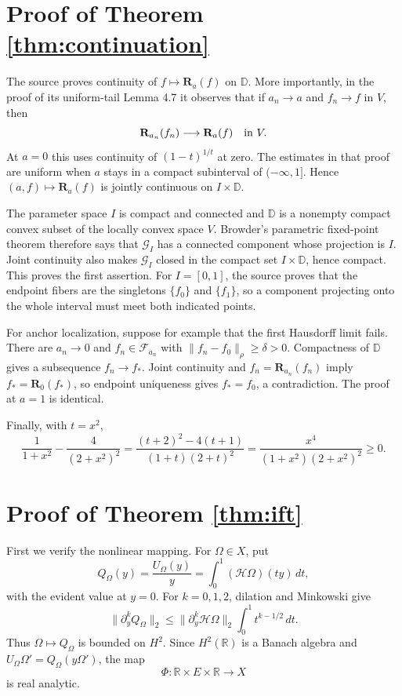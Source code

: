 \documentclass[11pt]{article}
\newcommand{\R}{\mathbb R}
\newcommand{\D}{\mathbb D}
\newcommand{\cH}{\mathcal H}
\newcommand{\cR}{\mathbf R}
\begin{document}
\section{Proof of Theorem \ref{thm:continuation}}

The source proves continuity of $f\mapsto\cR_a(f)$ on $\D$.  More
importantly, in the proof of its uniform-tail Lemma 4.7 it observes that if
$a_n\to a$ and $f_n\to f$ in $V$, then
\[
 \cR_{a_n}(f_n)\longrightarrow\cR_a(f)\quad\hbox{in }V.
\]
At $a=0$ this uses continuity of $(1-t)^{1/t}$ at zero.  The estimates in
that proof are uniform when $a$ stays in a compact subinterval of
$(-\infty,1]$.  Hence $(a,f)\mapsto\cR_a(f)$ is jointly continuous on
$I\times\D$.

The parameter space $I$ is compact and connected and $\D$ is a nonempty
compact convex subset of the locally convex space $V$.  Browder's parametric
fixed-point theorem therefore says that $\mathcal G_I$ has a connected
component whose projection is $I$.  Joint continuity also makes
$\mathcal G_I$ closed in the compact set $I\times\D$, hence compact.  This
proves the first assertion.  For $I=[0,1]$, the source proves that the endpoint
fibers are the singletons $\{f_0\}$ and $\{f_1\}$, so a component projecting
onto the whole interval must meet both indicated points.

For anchor localization, suppose for example that the first Hausdorff limit
fails.  There are $a_n\to0$ and $f_n\in\mathcal F_{a_n}$ with
$\|f_n-f_0\|_\rho\geq\delta>0$.  Compactness of $\D$ gives a subsequence
$f_n\to f_*$.  Joint continuity and $f_n=\cR_{a_n}(f_n)$ imply
$f_*=\cR_0(f_*)$, so endpoint uniqueness gives $f_*=f_0$, a contradiction.
The proof at $a=1$ is identical.

Finally, with $t=x^2$,
\[
 \frac1{1+x^2}-\frac4{(2+x^2)^2}
 =\frac{(t+2)^2-4(t+1)}{(1+t)(2+t)^2}
 =\frac{x^4}{(1+x^2)(2+x^2)^2}\geq0.
\]

\section{Proof of Theorem \ref{thm:ift}}

First we verify the nonlinear mapping.  For $\Omega\in X$, put
\[
 Q_\Omega(y)=\frac{U_\Omega(y)}y
 =\int_0^1(\cH\Omega)(ty)\,dt,
\]
with the evident value at $y=0$.  For $k=0,1,2$, dilation and Minkowski give
\[
 \|\partial_y^k Q_\Omega\|_2
 \leq \|\partial_y^k\cH\Omega\|_2
       \int_0^1t^{k-1/2}\,dt.
\]
Thus $\Omega\mapsto Q_\Omega$ is bounded on $H^2$.  Since $H^2(\R)$ is a
Banach algebra and $U_\Omega\Omega'=Q_\Omega(y\Omega')$, the map
\[
 \Phi:\R\times E\times\R\longrightarrow X
\]
is real analytic.
\end{document}
